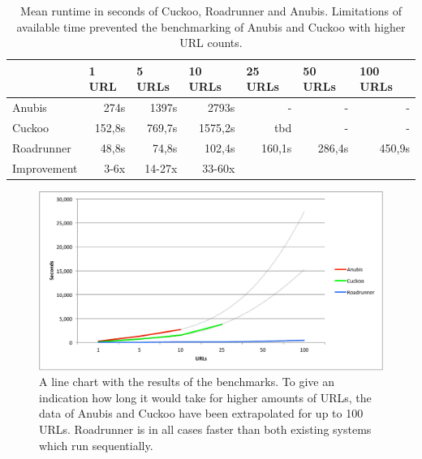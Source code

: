 \begin{table}[h]
\begin{tabular}{@{}lllllll@{}}
\toprule
                                  & 1 URL                       & 5 URLs                     & 10 URLs                     & 25 URLs                     & 50 URLs                     & 100 URLs \\ \midrule
Anubis                            & \multicolumn{1}{r}{274s}    & \multicolumn{1}{r}{1397s}  & \multicolumn{1}{r}{2793s}   & \multicolumn{1}{r}{-}       & \multicolumn{1}{r}{-}       & \multicolumn{1}{r}{-}      \\                                  
Cuckoo                            & \multicolumn{1}{r}{152,8s}  & \multicolumn{1}{r}{769,7s} & \multicolumn{1}{r}{1575,2s} & \multicolumn{1}{r}{tbd}     & \multicolumn{1}{r}{-}       & \multicolumn{1}{r}{-}      \\
Roadrunner                        & \multicolumn{1}{r}{48,8s}   & \multicolumn{1}{r}{74,8s}  & \multicolumn{1}{r}{102,4s}  & \multicolumn{1}{r}{160,1s}  & \multicolumn{1}{r}{286,4s}  & \multicolumn{1}{r}{450,9s} \\
Improvement                       & \multicolumn{1}{r}{3-6x}    & \multicolumn{1}{r}{14-27x} & \multicolumn{1}{r}{33-60x}  \\ \bottomrule
\end{tabular}
\caption{Mean runtime in seconds of Cuckoo, Roadrunner and Anubis. Limitations of available time prevented the benchmarking of Anubis and Cuckoo with higher URL counts.}
\label{tbl:results}
\end{table}

\begin{figure}[h!]
    \centering
    \centerline{\includegraphics[width=15cm]{Images/chart-trend}}
    \caption{A line chart with the results of the benchmarks. To give an indication how long it would take for higher amounts of URLs, the data of Anubis and Cuckoo have been extrapolated for up to 100 URLs. Roadrunner is in all cases faster than both existing systems which run sequentially.}
    \label{fig:chart-trend}
\end{figure}

\pagebreak

\restoregeometry
{}
\setcounter{page}{\thesavepage}
